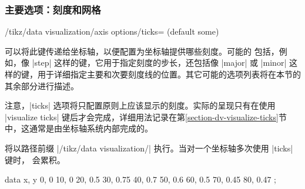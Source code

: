 \subsubsection{主要选项：刻度和网格}

\begin{key}{/tikz/data visualization/axis options/ticks= (default some)} %

    可以将此键传递给坐标轴，以便配置为坐标轴提供哪些刻度。可能的  包括，例如，像 |step| 这样的键，它用于指定刻度的步长，还包括像 |major| 或 |minor| 这样的键，用于详细指定主要和次要刻度线的位置。其它可能的选项列表将在本节的其余部分进行描述。


    注意，|ticks| 选项将只配置原则上应该显示的刻度。实际的呈现只有在使用 |visualize ticks| 键后才会完成，详细用法记录在第\ref{section-dv-visualize-ticks}节中，这通常是由坐标轴系统内部完成的。


     将以路径前缀 |/tikz/data visualization/| 执行。当对一个坐标轴多次使用 |ticks| 键时， 会累积。
\begin{codeexample}[width=6cm,preamble={\usetikzlibrary{datavisualization}}]
\tikz \datavisualization [
  scientific axes, visualize as line,
  x axis={ticks={step=24, minor steps between steps=3},
          label=hours}]
  data {
    x, y
    0, 0
    10, 0
    20, 0.5
    30, 0.75
    40, 0.7
    50, 0.6
    60, 0.5
    70, 0.45
    80, 0.47
  };
\end{codeexample}
\end{key}

